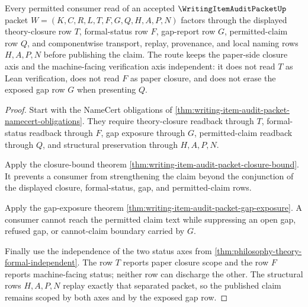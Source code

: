 \begin{theorem}
\label{thm:writing-item-audit-packet-scoped-claim-route}
Every permitted consumer read of an accepted $\WritingItemAuditPacketUp$ packet $W=(K,C,R,L,T,F,G,Q,H,A,P,N)$ factors through the displayed theory-closure row $T$, formal-status row $F$, gap-report row $G$, permitted-claim row $Q$, and componentwise transport, replay, provenance, and local naming rows $H,A,P,N$ before publishing the claim. The route keeps the paper-side closure axis and the machine-facing verification axis independent: it does not read $T$ as Lean verification, does not read $F$ as paper closure, and does not erase the exposed gap row $G$ when presenting $Q$.
\end{theorem}
\begin{proof}
Start with the NameCert obligations of \autoref{thm:writing-item-audit-packet-namecert-obligations}. They require theory-closure readback through $T$, formal-status readback through $F$, gap exposure through $G$, permitted-claim readback through $Q$, and structural preservation through $H,A,P,N$.

Apply the closure-bound theorem \autoref{thm:writing-item-audit-packet-closure-bound}. It prevents a consumer from strengthening the claim beyond the conjunction of the displayed closure, formal-status, gap, and permitted-claim rows.

Apply the gap-exposure theorem \autoref{thm:writing-item-audit-packet-gap-exposure}. A consumer cannot reach the permitted claim text while suppressing an open gap, refused gap, or cannot-claim boundary carried by $G$.

Finally use the independence of the two status axes from \autoref{thm:philosophy-theory-formal-independent}. The row $T$ reports paper closure scope and the row $F$ reports machine-facing status; neither row can discharge the other. The structural rows $H,A,P,N$ replay exactly that separated packet, so the published claim remains scoped by both axes and by the exposed gap row.
\end{proof}

